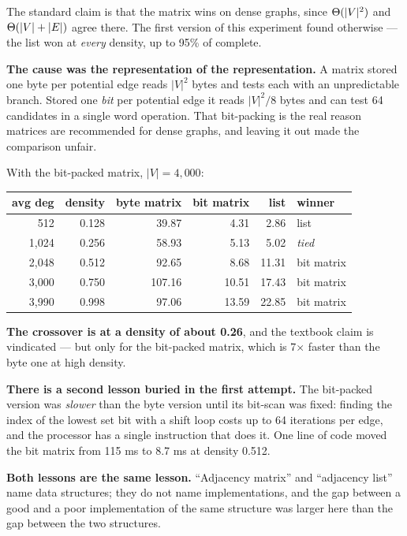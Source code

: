 \begin{worked}
The standard claim is that the matrix wins on dense graphs, since
$\Theta(|V|^{2})$ and $\Theta(|V|+|E|)$ agree there. The first version of this
experiment found otherwise --- the list won at \emph{every} density, up to 95\%
of complete.

\smallskip
\textbf{The cause was the representation of the representation.} A matrix
stored one byte per potential edge reads $|V|^{2}$ bytes and tests each with an
unpredictable branch. Stored one \emph{bit} per potential edge it reads
$|V|^{2}/8$ bytes and can test 64 candidates in a single word operation. That
bit-packing is the real reason matrices are recommended for dense graphs, and
leaving it out made the comparison unfair.

\smallskip
With the bit-packed matrix, $|V| = 4{,}000$:

\begin{center}
\begin{tabular}{@{}rrrrrl@{}}
\toprule
\rowcolor{primary!15}
avg deg & density & byte matrix & bit matrix & list & winner \\
\midrule
  512 & 0.128 &  39.87 &  4.31 &  2.86 & list \\
1{,}024 & 0.256 &  58.93 &  5.13 &  5.02 & \textit{tied} \\
2{,}048 & 0.512 &  92.65 &  8.68 & 11.31 & bit matrix \\
3{,}000 & 0.750 & 107.16 & 10.51 & 17.43 & bit matrix \\
3{,}990 & 0.998 &  97.06 & 13.59 & 22.85 & bit matrix \\
\bottomrule
\end{tabular}
\end{center}

\smallskip
\textbf{The crossover is at a density of about 0.26}, and the textbook claim is
vindicated --- but only for the bit-packed matrix, which is 7$\times$ faster
than the byte one at high density.

\smallskip
\textbf{There is a second lesson buried in the first attempt.} The bit-packed
version was \emph{slower} than the byte version until its bit-scan was fixed:
finding the index of the lowest set bit with a shift loop costs up to 64
iterations per edge, and the processor has a single instruction that does it.
One line of code moved the bit matrix from 115 ms to 8.7 ms at density 0.512.

\smallskip
\textbf{Both lessons are the same lesson.} ``Adjacency matrix'' and ``adjacency
list'' name data structures; they do not name implementations, and the gap
between a good and a poor implementation of the same structure was larger here
than the gap between the two structures.
\end{worked}

